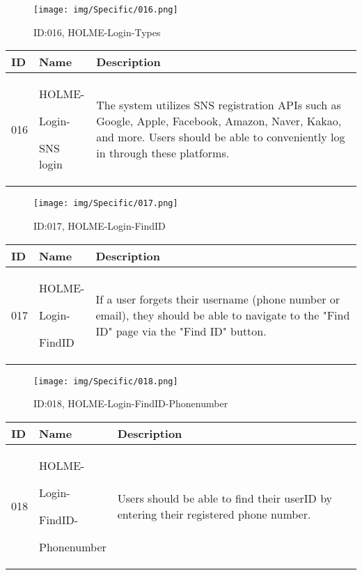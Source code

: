 \documentclass[conference]{IEEEtran}
\begin{document}
\begin{enumerate}
\begin{figure}[h]
\centering
\texttt{[image: img/Specific/016.png]}
\caption{ID:016, HOLME-Login-Types}
\end{figure}
\begin{table}[h]
\def\arraystretch{1.2} \small
    \begin{tabular}{|p{1cm}|p{1.8cm}|p{5.0cm}|}
        \hline
        ID & Name & Description\\ \hline
         016 \par  & HOLME-\par Login-\par SNS login &The system utilizes SNS registration APIs such as Google, Apple, Facebook, Amazon, Naver, Kakao, and more. Users should be able to conveniently log in through these platforms.\\ \hline
    \end{tabular}
\end{table}
\begin{figure}[h]
\centering
\texttt{[image: img/Specific/017.png]}
\caption{ID:017, HOLME-Login-FindID}
\end{figure}
\begin{table}[h]
\def\arraystretch{1.2} \small
    \begin{tabular}{|p{1cm}|p{1.8cm}|p{5.0cm}|}
        \hline
        ID & Name & Description\\ \hline
         017 \par  & HOLME-\par Login-\par FindID &If a user forgets their username (phone number or email), they should be able to navigate to the "Find ID" page via the "Find ID" button.\\ \hline
    \end{tabular}
\end{table}

\clearpage

\begin{figure}[h]
\centering
\texttt{[image: img/Specific/018.png]}
\caption{ID:018, HOLME-Login-FindID-Phonenumber}
\end{figure}
\begin{table}[h]
\def\arraystretch{1.2} \small
    \begin{tabular}{|p{1cm}|p{1.8cm}|p{5.0cm}|}
        \hline
        ID & Name & Description\\ \hline
         018 \par  & HOLME-\par Login-\par FindID- \par Phonenumber &Users should be able to find their userID by entering their registered phone number.\\ \hline
    \end{tabular}
\end{table}


\end{enumerate}
\end{document}

